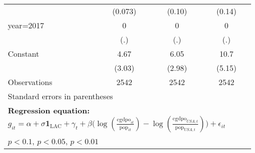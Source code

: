 \begin{sidewaystable}[htbp]
\begin{tabular}{l*{3}{c}}
                &  (0.073)         &   (0.10)         &   (0.14)         \\
\addlinespace
year=2017       &        0         &        0         &        0         \\
                &      (.)         &      (.)         &      (.)         \\
\addlinespace
Constant        &     4.67         &     6.05\sym{**} &     10.7\sym{**} \\
                &   (3.03)         &   (2.98)         &   (5.15)         \\
\midrule
Observations    &     2542         &     2542         &     2542         \\
\bottomrule
\multicolumn{4}{l}{\footnotesize Standard errors in parentheses}\\
\multicolumn{4}{l}{\footnotesize \textbf{Regression equation:} \(g_{it} = \alpha + \sigma \mathbf{1}_{\textrm{LAC}} + \gamma_t + \beta \big(\log (\frac{\textrm{cgdpo}_{it}}{\textrm{pop}_{it}} ) - \log (\frac{\textrm{cgdpo}_{USA,t}}{\textrm{pop}_{USA,t}}  ) \big) + \epsilon_{it}\)}\\
\multicolumn{4}{l}{\footnotesize \sym{*} \(p<0.1\), \sym{**} \(p<0.05\), \sym{***} \(p<0.01\)}\\
\end{tabular}
\end{sidewaystable}
